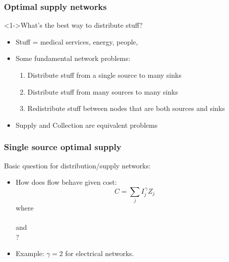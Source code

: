
\begin{frame}
  \frametitle{Optimal supply networks}

  \begin{block}<1->{What's the best way to distribute stuff?}
    \begin{itemize}
    \item<2-> Stuff = medical services, energy, people, 
    \item<3-> \alert{Some} fundamental network problems:
      \begin{enumerate}
      \item<4-> Distribute stuff from a \alert{single source} to
        \alert{many sinks}
      \item<5-> Distribute stuff from \alert{many sources} to
        many sinks
      \item<6-> \alert{Redistribute} stuff between nodes that
        are both sources and sinks
      \end{enumerate}
    \item<7-> Supply and Collection are equivalent problems
    \end{itemize}
  \end{block}
  
\end{frame}


\begin{frame}
  \frametitle{Single source optimal supply}

  \begin{block}{Basic question for distribution/supply networks:}
    \begin{itemize}
    \item<1->
      How does flow behave given cost:
      $$
      C 
      = 
      \sum_{j} I_j^{\, \gamma} Z_j
      $$
      where \\
      \\
      and\\
      ?
    \item<2->
      Example: $\gamma=2$ for electrical networks.
    \end{itemize}
  \end{block}
  
\end{frame}


